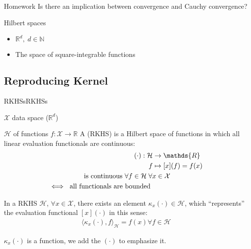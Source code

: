 \begin{question}{Homework}{}
	Is there an implication between convergence and Cauchy convergence?
\end{question}

\begin{example}{Hilbert spaces}{}
	\begin{itemize}
		\item $\mathds{R}^d, \; d \in \mathds{N}$
		\item The space of square-integrable functions
	\end{itemize}
\end{example}

\subsection{Reproducing Kernel}

\begin{definition}[parbox=false]{RKHSs}{RKHSs}

	$\mathcal{X}$ data space ($\mathds{R}^d$)

	$\mathcal{H}$ of functions $f: \mathcal{X} \to \mathds{R}$
  \tcbline
	A  (RKHS) is a Hilbert space
	of functions in which all linear evaluation functionals are continuous:
	\begin{align*}
		[x](\cdot) : \mathcal{H} & \to \mathds{R}                                     \\
		f                        & \mapsto [x](f) = f(x)                              \\
		\span
		\text{ is continuous } \forall f \in \mathcal{H} \; \forall x \in \mathcal{X} \\
		\iff \text{ all functionals are bounded }
	\end{align*}
\end{definition}

\begin{theorem}{}{}
	In a RKHS $\mathcal{H}$, $\forall x \in \mathcal{X}$, there
	exists an element $\kappa_x(\cdot) \in \mathcal{H}$, which
	``represents'' the evaluation functional $[x](\cdot)$
	in this sense:
	\begin{align*}
		\langle \kappa_x(\cdot), f \rangle_{\mathcal{H}} = f(x) \forall f \in \mathcal{H}
	\end{align*}
\begin{marker}
	$\kappa_x(\cdot)$ is a function, we add the $(\cdot)$ to emphasize it.
\end{marker}
\end{theorem}


